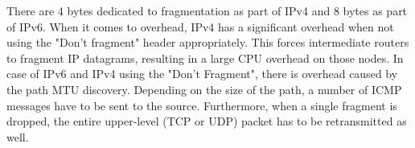 There are 4 bytes dedicated to fragmentation as part of IPv4 and 8 bytes as part of IPv6. When it comes to overhead, IPv4 has a significant overhead when not using the "Don't fragment" header appropriately. This forces intermediate routers to fragment IP datagrams, resulting in a large CPU overhead on those nodes. In case of IPv6 and IPv4 using the "Don't Fragment", there is overhead caused by the path MTU discovery. Depending on the size of the path, a number of ICMP messages have to be sent to the source. Furthermore, when a single fragment is dropped, the entire upper-level (TCP or UDP) packet has to be retransmitted as well.